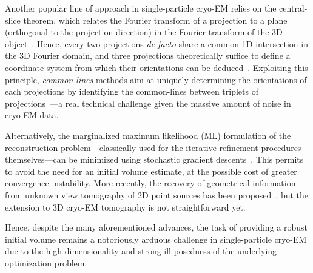 Another popular line of approach in single-particle cryo-EM  relies on the central-slice theorem, which relates the Fourier transform of a projection to a plane (orthogonal to the projection direction) in the Fourier transform of the 3D object~\cite{Natterer2001mathematics}. Hence, every two projections \textit{de facto} share a common 1D intersection in the 3D Fourier domain, and three projections theoretically suffice to define a coordinate system from which their orientations can be deduced~\cite{van1987angular}. Exploiting this principle, \textit{common-lines} methods aim at uniquely determining the orientations of each projections by identifying the common-lines between triplets of projections~\cite{penczek1994ribosome,mallick2006structure,singer2010detecting,wang2013orientation,greenberg2017common,pragier2019common}---a real technical challenge given the massive amount of noise in cryo-EM data. %

Alternatively, the  marginalized maximum likelihood (ML) formulation of the reconstruction problem---classically used for the iterative-refinement procedures themselves---can be minimized using stochastic gradient descents~\cite{punjani2017cryosparc}. This permits to avoid the need for an initial volume estimate, at the possible cost of greater convergence instability. More recently, the recovery of geometrical information from unknown view tomography of 2D point sources has been proposed~\cite{zehni2019distance}, but the extension to 3D cryo-EM tomography is not straightforward yet.

Hence, despite the many aforementioned advances, the task of providing a robust initial volume remains a notoriously arduous challenge in single-particle cryo-EM due to the high-dimensionality and strong ill-posedness of the underlying optimization problem.

